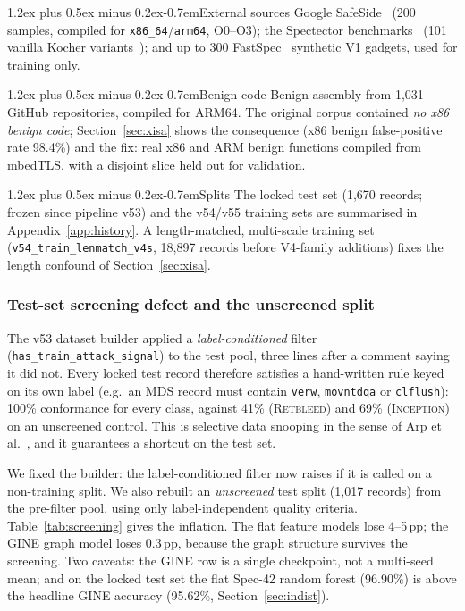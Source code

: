 \documentclass[conference]{IEEEtran}
\makeatletter
\renewcommand\paragraph{\@startsection{paragraph}{4}{\z@}%
  {1.2ex plus 0.5ex minus 0.2ex}{-0.7em}{\normalfont\normalsize\bfseries}}
\newcommand{\cls}[1]{\textsc{#1}}
\makeatother
\begin{document}
\paragraph{External sources}
Google SafeSide~\cite{safeside} (200 samples, compiled for
\texttt{x86\_64}/\texttt{arm64}, O0--O3); the Spectector
benchmarks~\cite{spectector} (101 vanilla Kocher variants~\cite{kocher2019spectre});
and up to 300 FastSpec~\cite{fastspec} synthetic V1 gadgets, used for
training only.

\paragraph{Benign code}
Benign assembly from 1,031 GitHub repositories, compiled for ARM64. The
original corpus contained \emph{no x86 benign code}; Section~\ref{sec:xisa}
shows the consequence (x86 benign false-positive rate 98.4\%) and the fix: real
x86 and ARM benign functions compiled from mbedTLS, with a disjoint slice held
out for validation.

\paragraph{Splits}
The locked test set (1,670 records; frozen since pipeline v53) and the v54/v55
training sets are summarised in Appendix~\ref{app:history}. A
length-matched, multi-scale training set
(\texttt{v54\_train\_lenmatch\_v4s}, 18,897 records before V4-family
additions) fixes the length confound of Section~\ref{sec:xisa}.

\subsubsection{Test-set screening defect and the unscreened split}
\label{sec:screening}

The v53 dataset builder applied a \emph{label-conditioned} filter
(\texttt{has\_train\_attack\_signal}) to the test pool, three lines after a
comment saying it did not. Every locked test record therefore satisfies a
hand-written rule keyed on its own label (e.g.\ an MDS record must contain
\texttt{verw}, \texttt{movntdqa} or \texttt{clflush}): 100\% conformance for
every class, against 41\% (\cls{Retbleed}) and 69\% (\cls{Inception}) on an
unscreened control. This is selective data snooping in the sense of Arp et
al.~\cite{arp2022}, and it guarantees a shortcut on the test set.

We fixed the builder: the label-conditioned filter now raises if it is called
on a non-training split. We also rebuilt an \emph{unscreened} test split
(1,017 records) from the pre-filter pool, using only label-independent quality
criteria. Table~\ref{tab:screening} gives the inflation. The flat feature
models lose 4--5\,pp; the GINE graph model loses 0.3\,pp, because the graph
structure survives the screening. Two caveats: the GINE row is a single
checkpoint, not a multi-seed mean; and on the locked test set the flat Spec-42
random forest (96.90\%) is above the headline GINE accuracy (95.62\%,
Section~\ref{sec:indist}).
\end{document}
